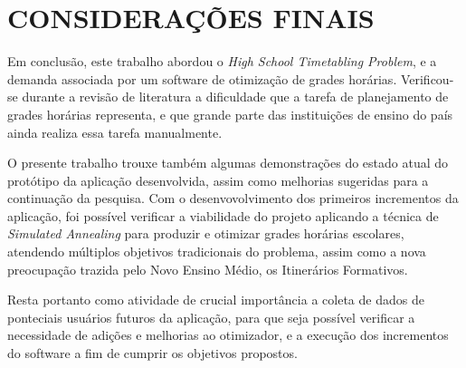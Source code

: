 
\chapter{CONSIDERAÇÕES FINAIS}
\label{chap:conclusao}

Em conclusão, este trabalho abordou o \textit{High School Timetabling Problem}, e a demanda associada por um software de otimização de grades horárias. Verificou-se durante a revisão de literatura a dificuldade que a tarefa de planejamento de grades horárias representa, e que grande parte das instituições de ensino do país ainda realiza essa tarefa manualmente.

O presente trabalho trouxe também algumas demonstrações do estado atual do protótipo da aplicação desenvolvida, assim como melhorias sugeridas para a continuação da pesquisa. Com o desenvovolvimento dos primeiros incrementos da aplicação, foi possível verificar a viabilidade do projeto aplicando a técnica de \textit{Simulated Annealing} para produzir e otimizar grades horárias escolares, atendendo múltiplos objetivos tradicionais do problema, assim como a nova preocupação trazida pelo Novo Ensino Médio, os Itinerários Formativos.

Resta portanto como atividade de crucial importância a coleta de dados de ponteciais usuários futuros da aplicação, para que seja possível verificar a necessidade de adições e melhorias ao otimizador, e a execução dos incrementos do software a fim de cumprir os objetivos propostos.